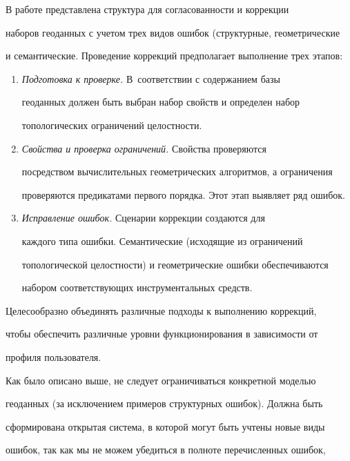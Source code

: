     


    В работе представлена структура для согласованности и коррекции 


наборов геоданных с учетом трех видов ошибок (структурные, геометрические 


и семантические. Проведение коррекций предполагает выполнение трех этапов: 


    \begin{enumerate}[1.]


    \item \textit{Подготовка к проверке.} В~соответствии с содержанием базы 


геоданных должен быть выбран набор свойств и определен набор 


топологических ограничений целостности.


    \item \textit{Свойства и проверка ограничений.} Свойства проверяются 


посредством вычислительных геометрических алгоритмов, а ограничения  


проверяются предикатами первого порядка. Этот этап выявляет ряд ошибок. 


    \item \textit{Исправление ошибок.} Сценарии коррекции создаются для 


каждого типа ошибки. Семантические (исходящие из ограничений 


топологической целостности) и геометрические ошибки обеспечиваются 


набором соответствующих инструментальных средств. 


    \end{enumerate}


    


    Целесообразно объединять различные подходы к выполнению коррекций, 


чтобы обеспечить различные уровни функционирования в зависимости от 


профиля пользователя. 


    


    Как было описано выше, не следует ограничиваться конкретной моделью 


геоданных (за исключением примеров структурных ошибок). Должна быть 


сформирована открытая система, в которой могут быть учтены новые виды 


ошибок, так как мы не можем убедиться в полноте перечисленных ошибок, 


